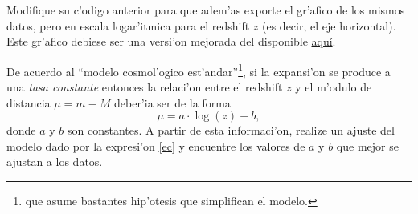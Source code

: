\documentclass[11pt]{exam}
\begin{document}
\begin{questions}
\begin{parts}
\item Modifique su c'odigo anterior para que adem'as exporte el gr'afico de los mismos datos, pero en escala logar'itmica para el redshift $z$ (es decir, el eje horizontal). Este gr'afico debiese ser una versi'on mejorada del disponible \href{https://github.com/gfrubi/RG/blob/master/fig/m-M_vs_z_semilog.pdf}{aqu\'i}.

\item De acuerdo al ``modelo cosmol'ogico est'andar''\footnote{que asume bastantes hip'otesis que simplifican el modelo.}, si la expansi'on se produce a una \textit{tasa constante} entonces la relaci'on entre el redshift $z$ y el m'odulo de distancia $\mu = m-M$ deber'ia ser de la forma
\begin{equation}\label{ec}
\mu=a\cdot \log(z)+b,
\end{equation}
donde $a$ y $b$ son constantes. A partir de esta informaci'on, realize un ajuste del modelo dado por la expresi'on \eqref{ec} y encuentre los valores de $a$ y $b$ que mejor se ajustan a los datos.
\end{parts}


\end{questions}
\end{document}
